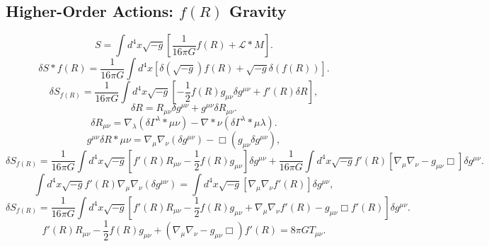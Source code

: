 \documentclass[11pt, a4paper]{report}
\begin{document}
\subsection{Higher-Order Actions: $f(R)$ Gravity}
\begin{equation}
\label{eq:fR_action}
S = \int d^{4}x \sqrt{-g} \left[ \frac{1}{16\pi G} f(R) + \mathcal{L}*{M} \right].
\end{equation}
\begin{equation}
\delta S*{f(R)} = \frac{1}{16\pi G} \int d^{4}x \left[ \delta(\sqrt{-g}) f(R) + \sqrt{-g} \delta(f(R)) \right].
\end{equation}
\begin{equation}
\delta S_{f(R)} = \frac{1}{16\pi G} \int d^{4}x \sqrt{-g} \left[ -\frac{1}{2}f(R)g_{\mu\nu}\delta g^{\mu\nu} + f'(R)\delta R \right],
\end{equation}
\begin{equation}
\label{eq:delta_R_expansion}
\delta R = R_{\mu\nu}\delta g^{\mu\nu} + g^{\mu\nu}\delta R_{\mu\nu}.
\end{equation}
\begin{equation}
\delta R_{\mu\nu} = \nabla_{\lambda}(\delta \Gamma^{\lambda}*{\mu\nu}) - \nabla*{\nu}(\delta \Gamma^{\lambda}*{\mu\lambda}).
\end{equation}
\begin{equation}
\label{eq:palatini_contracted}
g^{\mu\nu}\delta R*{\mu\nu} = \nabla_{\mu}\nabla_{\nu}(\delta g^{\mu\nu}) - \Box(g_{\mu\nu}\delta g^{\mu\nu}),
\end{equation}
\begin{equation}
\delta S_{f(R)} = \frac{1}{16\pi G} \int d^{4}x \sqrt{-g} \left[ f'(R)R_{\mu\nu} - \frac{1}{2}f(R)g_{\mu\nu} \right] \delta g^{\mu\nu} + \frac{1}{16\pi G} \int d^{4}x \sqrt{-g} f'(R) \left[ \nabla_{\mu}\nabla_{\nu} - g_{\mu\nu}\Box \right] \delta g^{\mu\nu}.
\end{equation}
\begin{equation}
\int d^{4}x \sqrt{-g} f'(R) \nabla_{\mu}\nabla_{\nu} (\delta g^{\mu\nu}) = \int d^{4}x \sqrt{-g} \left[ \nabla_{\mu}\nabla_{\nu} f'(R) \right] \delta g^{\mu\nu},
\end{equation}
\begin{equation}
\delta S_{f(R)} = \frac{1}{16\pi G} \int d^{4}x \sqrt{-g} \left[ f'(R)R_{\mu\nu} - \frac{1}{2}f(R)g_{\mu\nu} + \nabla_{\mu}\nabla_{\nu}f'(R) - g_{\mu\nu}\Box f'(R) \right] \delta g^{\mu\nu}.
\end{equation}
\begin{equation}
\label{eq:fR_field_equation}
f'(R)R_{\mu\nu} - \frac{1}{2}f(R)g_{\mu\nu} + \left( \nabla_{\mu}\nabla_{\nu} - g_{\mu\nu}\Box \right) f'(R) = 8\pi G T_{\mu\nu}.
\end{equation}
\end{document}
